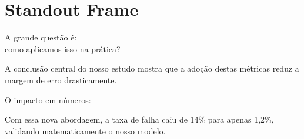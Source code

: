 \documentclass[aspectratio=169]{beamer}
\begin{document}
\section{Standout Frame}


\begin{frame}[standout]
    A grande questão é: \\ 
    como aplicamos isso na prática?
\end{frame}


\begin{frame}[standout]

    \begin{standoutbox}
        A conclusão central do nosso estudo 
        mostra que a adoção destas métricas 
        reduz a margem de erro drasticamente.
    \end{standoutbox}
\end{frame}


\begin{frame}[standout]

    \begin{standoutbox}[math300]
        O impacto em números: \\

        \vspace{0.3cm}

        \normalsize Com essa nova abordagem, a taxa de falha 
        caiu de 14\% para apenas 1,2\%, validando 
        matematicamente o nosso modelo.
    \end{standoutbox}
\end{frame}
\end{document}
